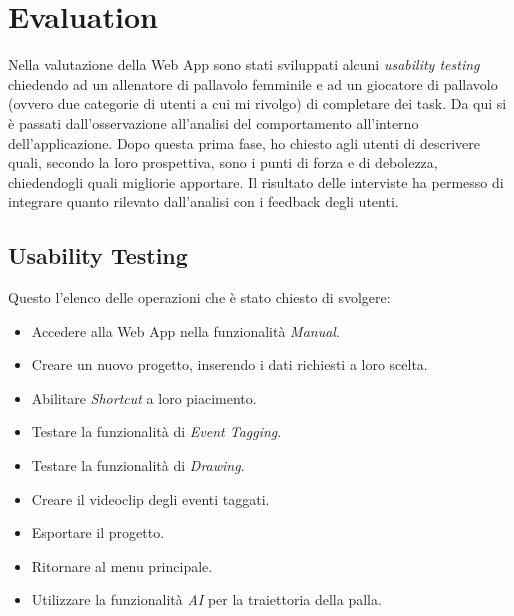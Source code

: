 \chapter{Evaluation}
\label{cha:evaluation}

Nella valutazione della Web App sono stati sviluppati alcuni \textit{usability testing} chiedendo ad un allenatore di pallavolo femminile e ad un giocatore di pallavolo (ovvero due categorie di utenti a cui mi rivolgo) di completare dei task. Da qui si è passati dall'osservazione all'analisi del comportamento all'interno dell'applicazione. Dopo questa prima fase, ho chiesto agli utenti di descrivere quali, secondo la loro prospettiva, sono i punti di forza e di debolezza, chiedendogli quali migliorie apportare. Il risultato delle interviste ha permesso di integrare quanto rilevato dall'analisi con i feedback degli utenti.



\section{Usability Testing}
Questo l'elenco delle operazioni che è stato chiesto di svolgere:
\begin{itemize}
    \item Accedere alla Web App nella funzionalità \textit{Manual}.
    \item Creare un nuovo progetto, inserendo i dati richiesti a loro scelta.
    \item Abilitare \textit{Shortcut} a loro piacimento.
    \item Testare la funzionalità di \textit{Event Tagging}.
    \item Testare la funzionalità di \textit{Drawing}.
    \item Creare il videoclip degli eventi taggati.
    \item Esportare il progetto.
    \item Ritornare al menu principale.
    \item Utilizzare la funzionalità \textit{AI} per la traiettoria della palla.
\end{itemize}

